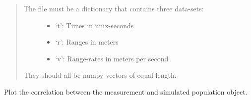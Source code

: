 \documentclass[letterpaper,10pt,english]{sphinxmanual}
\begin{document}
\begin{fulllineitems}
\begin{quote}
\begin{description}
\begin{itemize}
\end{itemize}

\end{description}\end{quote}

\begin{quote}
\begin{description}
\item[{The file must be a dictionary that contains three data-sets:}] \leavevmode\begin{itemize}
\item {} 
‘t’: Times in unix-seconds

\item {} 
‘r’: Ranges in meters

\item {} 
‘v’: Range-rates in meters per second

\end{itemize}

\end{description}

They should all be numpy vectors of equal length.
\end{quote}

\end{fulllineitems}


\begin{fulllineitems}
\label{\detokenize{modules/correlator:correlator.plot_correlation}}
Plot the correlation between the measurement and simulated population object.

\end{fulllineitems}

\end{document}
